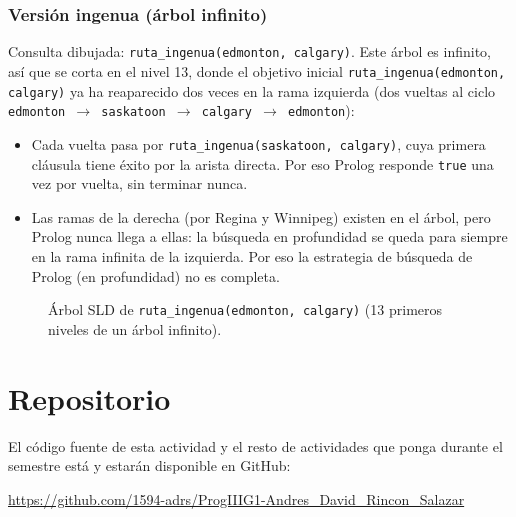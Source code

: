\documentclass[12pt]{report}
\begin{document}
\subsection{Versión ingenua (árbol infinito)}

Consulta dibujada: \texttt{ruta\_ingenua(edmonton, calgary)}. Este árbol
es infinito, así que se corta en el nivel 13, donde el objetivo inicial
\texttt{ruta\_ingenua(edmonton, calgary)} ya ha reaparecido dos veces en la
rama izquierda (dos vueltas al ciclo \texttt{edmonton $\to$ saskatoon
$\to$ calgary $\to$ edmonton}):

\begin{itemize}
    \item Cada vuelta pasa por \texttt{ruta\_ingenua(saskatoon, calgary)},
          cuya primera cláusula tiene éxito por la arista directa. Por eso
          Prolog responde \texttt{true} una vez por vuelta, sin terminar
          nunca.
    \item Las ramas de la derecha (por Regina y Winnipeg) existen en el
          árbol, pero Prolog nunca llega a ellas: la búsqueda en
          profundidad se queda para siempre en la rama infinita de la
          izquierda. Por eso la estrategia de búsqueda de Prolog (en
          profundidad) no es completa.
\end{itemize}
\begin{landscape}
\begin{figure}[p]
    \centering
    \caption{Árbol SLD de \texttt{ruta\_ingenua(edmonton, calgary)} (13 primeros niveles de un árbol infinito).}
\end{figure}
\end{landscape}

\newpage


\chapter{Repositorio}

El código fuente de esta actividad y el resto de actividades que ponga durante el semestre está y estarán disponible en GitHub:

\begin{center}
    \url{https://github.com/1594-adrs/ProgIIIG1-Andres_David_Rincon_Salazar}
\end{center}
\end{document}
